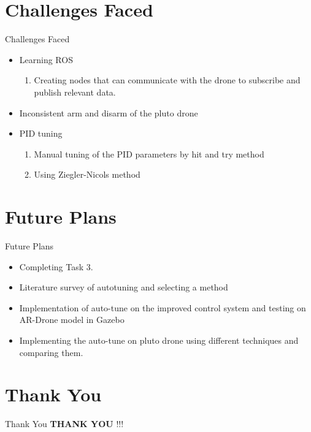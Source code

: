 \documentclass[10pt, a4paper]{beamer}
\begin{document}
\section{Challenges Faced}
\begin{frame}{Challenges Faced}
	\begin{itemize}
\item \large{Learning ROS} \vspace{1em}
\begin{enumerate}
	\item Creating nodes that can communicate with the drone to subscribe and publish relevant data.\vspace{1em}
	
\end{enumerate} 
\item Inconsistent arm and disarm of the pluto drone\vspace{1em}

\item PID tuning \vspace{1em}

\begin{enumerate}
	\item Manual tuning of the PID parameters by hit and try method\vspace{1em}
	
	\item Using Ziegler-Nicols method\vspace{1em}
	
\end{enumerate} 
		  
	\end{itemize}

\end{frame}

\section{Future Plans}
\begin{frame}{Future Plans}
	\begin{itemize}
		\item Completing Task 3.
		\vspace{1em}
		\item Literature survey of autotuning and selecting a method
		\vspace{1em} 
		\item Implementation of auto-tune on the improved control system and testing on AR-Drone model in Gazebo
		\vspace{1em}
		\item Implementing the auto-tune on pluto drone using different techniques and comparing them.
		\vspace{1em}
	\end{itemize}
\end{frame}


\section{Thank You}
\begin{frame}{Thank You}
	\centering \textbf{THANK YOU} !!!
\end{frame}
\end{document}
